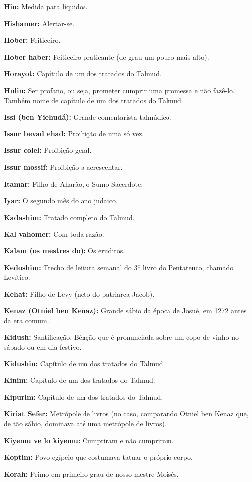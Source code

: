 \begin{hangparas}{.25in}{1}
{\textbf{Hin:} Medida para líquidos.

\textbf{Hishamer:} Alertar-se.

\textbf{Hober:} Feiticeiro.

\textbf{Hober haber:} Feiticeiro praticante (de grau um pouco mais alto).

\textbf{Horayot:} Capítulo de um dos tratados do Talmud.

\textbf{Hulin:} Ser profano, ou seja, prometer cumprir uma promessa e
não fazê-lo. Também nome de capítulo de um dos tratados do Talmud.

\textbf{Issi (ben Yiehudá):} Grande comentarista talmúdico.

\textbf{Issur bevad ehad:} Proibição de uma só vez.

\textbf{Issur colel:} Proibição geral.

\textbf{Issur mossif:} Proibição a acrescentar.

\textbf{Itamar:} Filho de Aharão, o Sumo Sacerdote.

\textbf{Iyar:} O segundo mês do ano judaico.

\textbf{Kadashim:} Tratado completo do Talmud.

\textbf{Kal vahomer:} Com toda razão.

\textbf{Kalam (os mestres do):} Os eruditos.

\textbf{Kedoshim:} Trecho de leitura semanal do 3º livro
do Pentateuco, chamado Levítico.

\textbf{Kehat:} Filho de Levy (neto do patriarca Jacob).

\textbf{Kenaz (Otniel ben Kenaz):} Grande sábio da época de Josué, em
1272 antes da era comum.

\textbf{Kidush:} Santificação. Bênção que é pronunciada sobre um copo
de vinho no sábado ou em dia festivo.

\textbf{Kidushin:} Capítulo de um dos tratados do Talmud.

\textbf{Kinim:} Capítulo de um dos tratados do Talmud.

\textbf{Kipurim:} Capítulo de um dos tratados do Talmud.

\textbf{Kiriat Sefer:} Metrópole de livros (no caso, comparando Otniel
ben Kenaz que, de tão sábio, dominava até uma metrópole de livros).

\textbf{Kiyemu ve lo kiyemu:} Cumpriram e não cumpriram.

\textbf{Koptim:} Povo egípcio que costumava tatuar o próprio corpo.

\textbf{Korah:} Primo em primeiro grau de nosso mestre Moisés.

}
\end{hangparas}
